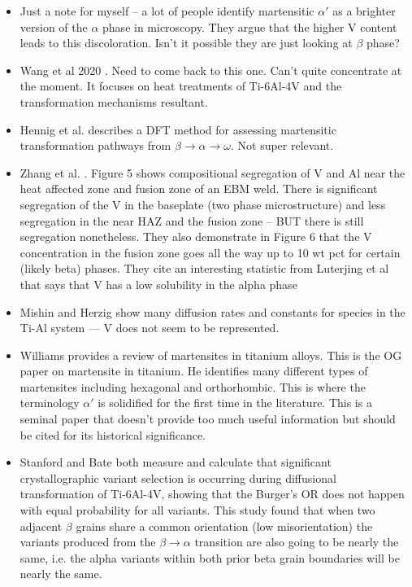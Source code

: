 \begin{itemize}
	\item Just a note for myself -- a lot of people identify martensitic $\alpha'$ as a brighter version of the $\alpha$ phase in microscopy. They argue that the higher V content leads to this discoloration. Isn't it possible they are just looking at $\beta$ phase?
	\item Wang et al 2020 \cite{Wang2020a}. Need to come back to this one. Can't quite concentrate at the moment. It focuses on heat treatments of Ti-6Al-4V and the transformation mechanisms resultant.
	\item Hennig et al. \cite{Hennig2008} describes a DFT method for assessing martensitic transformation pathways from $\beta \to \alpha \to \omega$. Not super relevant.
	\item Zhang et al. \cite{Zhang2019}. Figure 5 shows compositional segregation of V and Al near the heat affected zone and fusion zone of an EBM weld. There is significant segregation of the V in the baseplate (two phase microstructure) and less segregation in the near HAZ and the fusion zone -- BUT there is still segregation nonetheless. They also demonstrate in Figure 6 that the V concentration in the fusion zone goes all the way up to 10 wt pct for certain (likely beta) phases. They cite an interesting statistic from Luterjing et al that says that V has a low solubility in the alpha phase
	\item Mishin and Herzig \cite{Mishin2000} show many diffusion rates and constants for species in the Ti-Al system --- V does not seem to be represented.
	\item Williams \cite{Williams1972} provides a review of martensites in titanium alloys. This is the OG paper on martensite in titanium. He identifies many different types of martensites including hexagonal and orthorhombic. This is where the terminology $\alpha'$ is solidified for the first time in the literature. This is a seminal paper that doesn't provide too much useful information but should be cited for its historical significance.
	\item Stanford and Bate \cite{Stanford2004} both measure and calculate that significant crystallographic variant selection is occurring during diffusional transformation of Ti-6Al-4V, showing that the Burger's OR does not happen with equal probability for all variants. This study found that when two adjacent $\beta$ grains share a common orientation (low misorientation) the variants produced from the $\beta \to \alpha$ transition are also going to be nearly the same, i.e. the alpha variants within both prior beta grain boundaries will be nearly the same.

\end{itemize}
